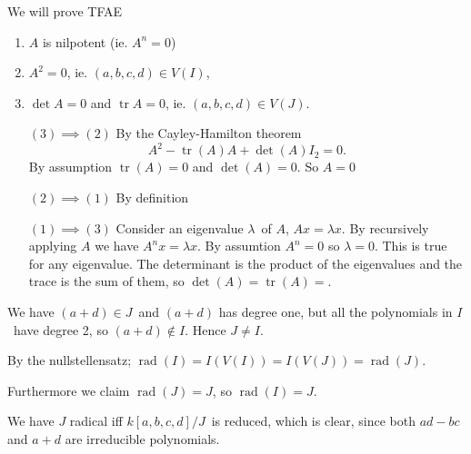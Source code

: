 \documentclass[a4paper,11pt,english]{article}
\DeclareMathOperator{\rad}{rad}
\DeclareMathOperator{\tr}{tr}
\begin{document}
\begin{solution}[4]
We will prove TFAE
\begin{enumerate}
\item $A$ is nilpotent (ie. $A^n = 0$)
\item $A^2 = 0$, ie. $(a,b,c,d) \in V(I)$,
\item $\det A = 0$ and $\tr A = 0$, ie. $(a,b,c,d) \in V(J)$.
\end{enumerate}

\begin{enumerate}
\item[$(3)\implies(2)$]
By the Cayley-Hamilton theorem
\[ A^2 - \tr(A) A + \det(A) I_2 = 0. \]
By assumption $\tr(A) = 0$ and $\det(A) = 0$. So $A = 0$
\item[$(2)\implies(1)$]
By definition 
\item[$(1)\implies(3)$]
Consider an eigenvalue $\lambda$ of $A$, $A x = \lambda x$. By recursively
applying $A$ we have $A^n x = \lambda x$.
By assumtion $A^n = 0$ so $\lambda = 0$. This is true for any eigenvalue. 
The determinant is the product of the eigenvalues and the trace is the sum of
them, so $\det(A) = \tr(A) = $.
\end{enumerate}


We have $(a+d) \in J$ and $(a+d)$ has degree one, but all the polynomials in
$I$ have degree 2, so $(a+d) \not\in I$. Hence $J \ne I$.

By the nullstellensatz; $\rad(I) = I(V(I)) = I(V(J)) = \rad(J)$.

Furthermore we claim $\rad(J) = J$, so $\rad(I) = J$.

We have $J$ radical iff $k[a,b,c,d] / J$ is reduced, which is clear, since
both $ad-bc$ and $a+d$ are irreducible polynomials.
\end{solution}
\end{document}
